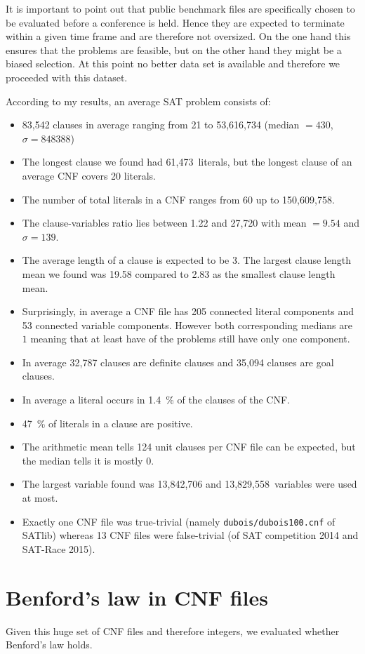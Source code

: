 It is important to point out that public benchmark files are specifically chosen
to be evaluated before a conference is held. Hence they are expected to terminate
within a given time frame and are therefore not oversized. On the one hand this
ensures that the problems are feasible, but on the other hand they might be a
biased selection. At this point no better data set is available and therefore
we proceeded with this dataset.

According to my results, an average SAT problem consists of:
\begin{itemize}
  \item 83,542 clauses in average ranging from 21 to 53,616,734 (median $= 430$, $\sigma = 848388$)
  \item The longest clause we found had 61,473~literals, but the longest clause of an average CNF covers 20 literals.
  \item The number of total literals in a CNF ranges from 60 up to 150,609,758.
  \item The clause-variables ratio lies between 1.22 and 27,720 with mean $= 9.54$ and $\sigma = 139$.
  \item The average length of a clause is expected to be 3. The largest clause length mean we found was 19.58 compared to 2.83 as the smallest clause length mean.
  \item Surprisingly, in average a CNF file has 205 connected literal components and 53 connected variable components. However both corresponding medians are $1$ meaning that at least have of the problems still have only one component.
  \item In average 32,787 clauses are definite clauses and 35,094 clauses are goal clauses.
  \item In average a literal occurs in 1.4~\% of the clauses of the CNF.
  \item 47~\% of literals in a clause are positive.
  \item The arithmetic mean tells 124 unit clauses per CNF file can be expected, but the median tells it is mostly 0.
  \item The largest variable found was 13,842,706 and 13,829,558~variables were used at most.
  \item Exactly one CNF file was true-trivial (namely \texttt{dubois/dubois100.cnf} of SATlib)
    whereas 13 CNF files were false-trivial (of SAT competition 2014 and SAT-Race 2015).
\end{itemize}

\section{Benford's law in CNF files}
\label{sec:benford}
%
Given this huge set of CNF files and therefore integers, we evaluated whether Benford's law holds.

